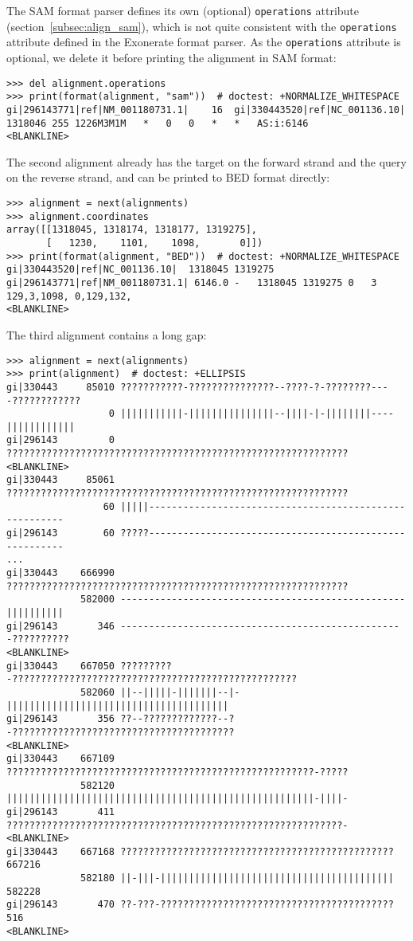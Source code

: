 The SAM format parser defines its own (optional) \verb|operations| attribute (section~\ref{subsec:align_sam}), which is not quite consistent with the \verb|operations| attribute defined in the Exonerate format parser. As the \verb|operations| attribute is optional, we delete it before printing the alignment in SAM format:
\begin{verbatim}
>>> del alignment.operations
>>> print(format(alignment, "sam"))  # doctest: +NORMALIZE_WHITESPACE
gi|296143771|ref|NM_001180731.1|	16	gi|330443520|ref|NC_001136.10|	1318046	255	1226M3M1M	*	0	0	*	*	AS:i:6146
<BLANKLINE>
\end{verbatim}

The second alignment already has the target on the forward strand and the query on the reverse strand, and can be printed to BED format directly:
\begin{verbatim}
>>> alignment = next(alignments)
>>> alignment.coordinates
array([[1318045, 1318174, 1318177, 1319275],
       [   1230,    1101,    1098,       0]])
>>> print(format(alignment, "BED"))  # doctest: +NORMALIZE_WHITESPACE
gi|330443520|ref|NC_001136.10|	1318045	1319275	gi|296143771|ref|NM_001180731.1| 6146.0	-	1318045	1319275	0	3	129,3,1098,	0,129,132,
<BLANKLINE>
\end{verbatim}
The third alignment contains a long gap:
\begin{verbatim}
>>> alignment = next(alignments)
>>> print(alignment)  # doctest: +ELLIPSIS
gi|330443     85010 ???????????-???????????????--????-?-????????----????????????
                  0 |||||||||||-|||||||||||||||--||||-|-||||||||----||||||||||||
gi|296143         0 ????????????????????????????????????????????????????????????
<BLANKLINE>
gi|330443     85061 ????????????????????????????????????????????????????????????
                 60 |||||-------------------------------------------------------
gi|296143        60 ?????-------------------------------------------------------
...
gi|330443    666990 ????????????????????????????????????????????????????????????
             582000 --------------------------------------------------||||||||||
gi|296143       346 --------------------------------------------------??????????
<BLANKLINE>
gi|330443    667050 ?????????-??????????????????????????????????????????????????
             582060 ||--|||||-|||||||--|-|||||||||||||||||||||||||||||||||||||||
gi|296143       356 ??--?????????????--?-???????????????????????????????????????
<BLANKLINE>
gi|330443    667109 ??????????????????????????????????????????????????????-?????
             582120 ||||||||||||||||||||||||||||||||||||||||||||||||||||||-||||-
gi|296143       411 ???????????????????????????????????????????????????????????-
<BLANKLINE>
gi|330443    667168 ???????????????????????????????????????????????? 667216
             582180 ||-|||-||||||||||||||||||||||||||||||||||||||||| 582228
gi|296143       470 ??-???-?????????????????????????????????????????    516
<BLANKLINE>
\end{verbatim}
